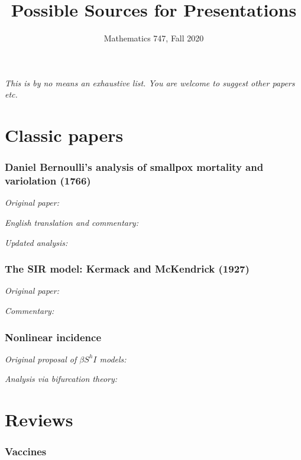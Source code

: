 \documentclass[12pt]{article}
\title{Possible Sources for Presentations}
\author{Mathematics 747, Fall 2020}
\begin{document}
\maketitle

\emph{This is by no means an exhaustive list.  You are welcome to
  suggest other papers etc.}

\section*{Classic papers}

\subsubsection*{Daniel Bernoulli's analysis of smallpox mortality and variolation (1766)}

\emph{Original paper:}\\

\emph{English translation and commentary:}\\

\emph{Updated analysis:}\\

\subsubsection*{The SIR model: Kermack and McKendrick (1927)}

\emph{Original paper:}\\

\emph{Commentary:}\\

\subsubsection*{Nonlinear incidence}

\emph{Original proposal of $\beta S^hI$ models:}\\

\emph{Analysis via bifurcation theory:}\\

\section*{Reviews}

\subsubsection*{Vaccines}
\end{document}
